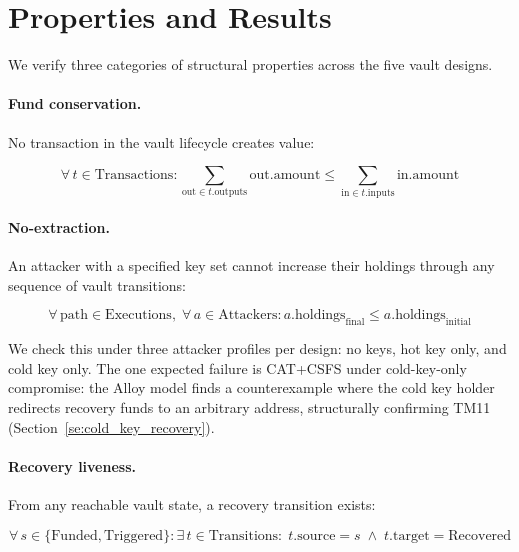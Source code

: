 \section{Properties and Results} \label{se:properties_verified}

We verify three categories of structural properties across the five vault designs.

\paragraph{Fund conservation.}
No transaction in the vault lifecycle creates value:

\begin{equation} \label{eq:fund_conservation}
\forall\, t \in \text{Transactions}:
  \sum_{\text{out} \in t.\text{outputs}} \text{out.amount}
  \leq \sum_{\text{in} \in t.\text{inputs}} \text{in.amount}
\end{equation}

\paragraph{No-extraction.}
An attacker with a specified key set cannot increase their holdings through any
sequence of vault transitions:

\begin{equation} \label{eq:no_extraction}
\forall\, \text{path} \in \text{Executions},\;
\forall\, a \in \text{Attackers}:
  a.\text{holdings}_{\text{final}} \leq a.\text{holdings}_{\text{initial}}
\end{equation}

\noindent
We check this under three attacker profiles per design: no keys, hot key only, and
cold key only. The one expected failure is CAT+CSFS under cold-key-only compromise:
the Alloy model finds a counterexample where the cold key holder redirects recovery
funds to an arbitrary address, structurally confirming TM11
(Section~\ref{se:cold_key_recovery}).

\paragraph{Recovery liveness.}
From any reachable vault state, a recovery transition exists:

\begin{equation} \label{eq:recovery_liveness}
\forall\, s \in \{\text{Funded}, \text{Triggered}\}:
  \exists\, t \in \text{Transitions}:\;
  t.\text{source} = s \;\wedge\; t.\text{target} = \text{Recovered}
\end{equation}

